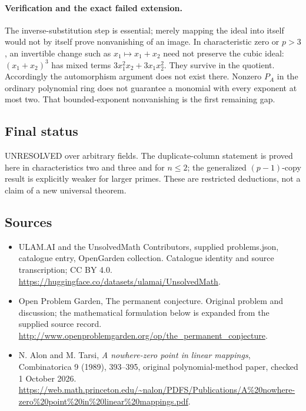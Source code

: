 \documentclass[11pt,a4paper]{article}
\begin{document}
\paragraph{Verification and the exact failed extension.}
The inverse-substitution step is essential; merely mapping the ideal
into itself would not by itself prove nonvanishing of an image. In
characteristic zero or $p>3$, an invertible change such as
$x_1\mapsto x_1+x_2$ need not preserve the cubic ideal:
$(x_1+x_2)^3$ has mixed terms $3x_1^2x_2+3x_1x_2^2$.
They survive in the quotient. Accordingly the automorphism argument
does not exist there. Nonzero $P_A$ in the ordinary polynomial ring
does not guarantee a monomial with every exponent at most two.
That bounded-exponent nonvanishing is the first remaining gap.

\subsection{Final status}
UNRESOLVED over arbitrary fields. The duplicate-column statement is
proved here in characteristics two and three and for $n\le2$; the
generalized $(p-1)$-copy result is explicitly weaker for larger primes.
These are restricted deductions, not a claim of a new universal theorem.

\subsection{Sources}
\begin{itemize}
\item[S1] ULAM.AI and the UnsolvedMath Contributors, supplied problems.json, catalogue entry, OpenGarden collection. Catalogue identity and source transcription; CC BY 4.0.
\url{https://huggingface.co/datasets/ulamai/UnsolvedMath}.
\item[S2] Open Problem Garden, The permanent conjecture. Original problem and discussion; the mathematical formulation below is expanded from the supplied source record.
\url{http://www.openproblemgarden.org/op/the_permanent_conjecture}.
\item[S3] N. Alon and M. Tarsi, \emph{A nowhere-zero point in linear mappings}, Combinatorica 9 (1989), 393--395, original polynomial-method paper, checked 1 October 2026.
\url{https://web.math.princeton.edu/~nalon/PDFS/Publications/A%20nowhere-zero%20point%20in%20linear%20mappings.pdf}.
\end{itemize}
\end{document}
